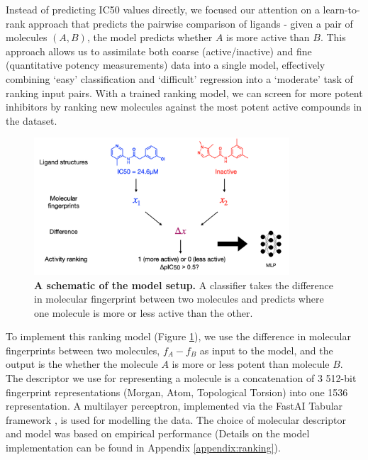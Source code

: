 Instead of predicting IC50 values directly, we focused our attention on a learn-to-rank approach \cite{duffy2010molecular,agarwal2010ranking} that predicts the pairwise comparison of ligands - given a pair of molecules $(A, B)$, the model predicts whether $A$ is more active than $B$. This approach allows us to assimilate both coarse (active/inactive) and fine (quantitative potency measurements) data into a single model, effectively combining `easy' classification and `difficult' regression into a `moderate' task of ranking input pairs. With a trained ranking model, we can screen for more potent inhibitors by ranking new molecules against the most potent active compounds in the dataset.

\begin{figure}[!th]
 \centering
 \includegraphics[width=0.85\textwidth]{Chapters/Ranking/Figs/schematic.png}
 \caption{\textbf{A schematic of the model setup.} A classifier takes the difference in molecular fingerprint between two molecules and predicts where one molecule is more or less active than the other.}
 \label{fig:ranking_schematic}
\end{figure}

To implement this ranking model (Figure \ref{fig:ranking_schematic}), we use the difference in molecular fingerprints between two molecules, $f_A - f_B$ as input to the model, and the output is the whether the molecule $A$ is more or less potent than molecule $B$. The descriptor we use for representing a molecule is a concatenation of 3 512-bit fingerprint representations (Morgan, Atom, Topological Torsion) into one 1536 representation. A multilayer perceptron, implemented via the FastAI Tabular framework \cite{howard2018fastai}, is used for modelling the data. The choice of molecular descriptor and model was based on empirical performance (Details on the model implementation can be found in Appendix \ref{appendix:ranking}). %

